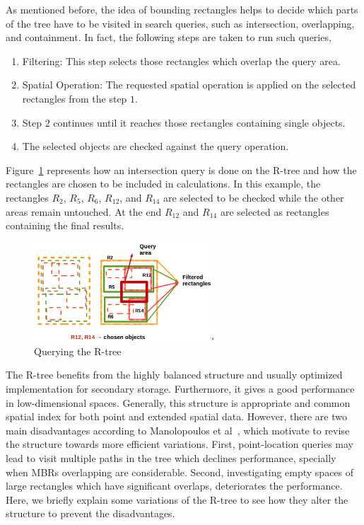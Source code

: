 \documentclass[a4paper,12pt]{article}
\begin{document}
As mentioned before, the idea of bounding rectangles helps to decide which parts of the tree have to be visited in search queries, such as intersection, overlapping, and containment. In fact, the following steps are taken to run such queries,
\begin{enumerate}
\item Filtering: This step selects those rectangles which overlap the query area.
\item Spatial Operation: The requested spatial operation is applied on the selected rectangles from the step $1$. 
\item Step $2$ continues until it reaches those rectangles containing single objects. 
\item The selected objects are checked against the query operation. 
\end{enumerate}
Figure~\ref{rtreequery} represents how an intersection query is done on the R-tree and how the rectangles are chosen to be included in calculations. In this example, the rectangles $R_2$, $R_5$, $R_6$, $R_{12}$, and $R_{14}$ are selected to be checked while the other areas remain untouched. At the end $R_{12}$ and $R_{14}$ are selected as rectangles containing the final results.

\begin{figure}
\centering
\includegraphics[width=0.6\textwidth,height=0.2\textheight]{Rtree-query}
\caption{Querying the R-tree}
\label{rtreequery}
\end{figure}

The R-tree benefits from the highly balanced structure and usually optimized implementation for secondary storage. Furthermore, it gives a good performance in low-dimensional spaces. Generally, this structure is appropriate and common spatial index for both point and extended spatial data. However, there are two main disadvantages according to Manolopoulos et al~\cite{Manolopoulos:2005}, which motivate to revise the structure towards more efficient variations. First, point-location queries may lead to visit multiple paths in the tree which declines performance, specially when MBRs overlapping are considerable. Second, investigating empty spaces of large rectangles which have significant overlaps, deteriorates the performance. Here, we briefly explain some variations of the R-tree to see how they alter the structure to prevent the disadvantages.
\end{document}
